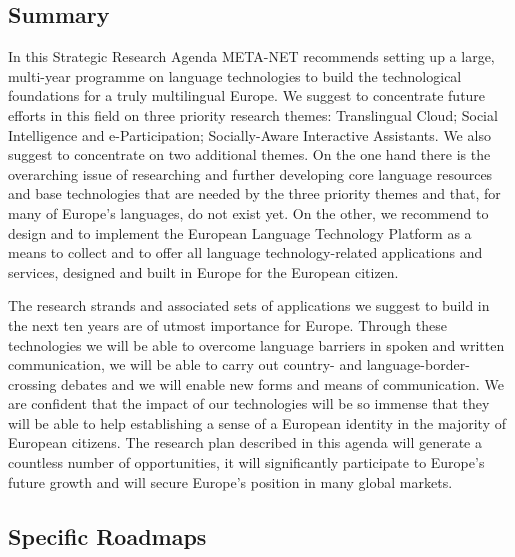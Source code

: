 \documentclass[10pt, plain]{../../metanetpaper}
\begin{document}
\begin{multicols}{2}

\subsection{Summary}
\label{sec:final-summary}

In this Strategic Research Agenda META-NET recommends setting up a large, multi-year programme on language technologies to build the technological foundations for a truly multilingual Europe. We suggest to concentrate future efforts in this field on three priority research themes: Translingual Cloud; Social Intelligence and e-Participation; Socially-Aware Interactive Assistants. We also suggest to concentrate on two additional themes. On the one hand there is the overarching issue of researching and further developing core language resources and base technologies that are needed by the three priority themes and that, for many of Europe's languages, do not exist yet. On the other, we recommend to design and to implement the European Language Technology Platform as a means to collect and to offer all language technology-related applications and services, designed and built in Europe for the European citizen.

The research strands and associated sets of applications we suggest to build in the next ten years are of utmost importance for Europe. Through these technologies we will be able to overcome language barriers in spoken and written communication, we will be able to carry out country- and language-border-crossing debates and we will enable new forms and means of communication. We are confident that the impact of our technologies will be so immense that they will be able to help establishing a sense of a European identity in the majority of European citizens. The research plan described in this agenda will generate a countless number of opportunities, it will significantly participate to Europe's future growth and will secure Europe's position in many global markets.

\subsection{Specific Roadmaps}
\label{sec:roadmaps}


\end{multicols}
\end{document}
